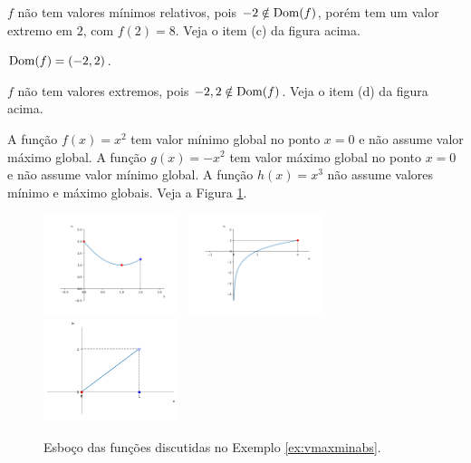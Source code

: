 \cleardoublepage\documentclass[../main.tex]{subfiles}
\begin{document}
\begin{ex}
\begin{compactenum}[a.]
\begin{solution}
\(f\) não tem valores mínimos relativos, pois \(-2 \notin {\rm Dom}(f)\), porém tem um valor extremo em \(2\), com \(f(2)=8\). Veja o item (c) da figura acima.
\end{solution}
\item \({\rm Dom}(f)=(-2,2)\).

\begin{solution}
\(f\) não tem valores extremos, pois \(-2, 2 \notin {\rm Dom}(f)\). Veja o item (d) da figura acima.
\end{solution}
\end{compactenum}
\end{ex}
\begin{ex}\label{ex:vmaxminabs}
  A função $f(x) = x^2$ tem valor mínimo global no ponto $x=0$ e não assume valor máximo global. A função $g(x) = -x^2$ tem valor máximo global no ponto $x=0$ e não assume valor mínimo global. A função $h(x)=x^3$ não assume valores mínimo e máximo globais. Veja a Figura \ref{fig:ex_vmaxminabs}.
  \begin{figure}[!htb]
    \centering
    \includegraphics[width=0.35\textwidth]{./fig_apl_deriv/fig_f}~
    \includegraphics[width=0.35\textwidth]{./fig_apl_deriv/fig_g}~
    \includegraphics[width=0.35\textwidth]{./fig_apl_deriv/fig_h}
    \caption{Esboço das funções discutidas no Exemplo \ref{ex:vmaxminabs}.}
    \label{fig:ex_vmaxminabs}
  \end{figure}
\end{ex}
\end{document}
